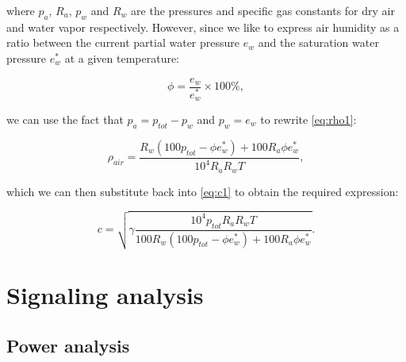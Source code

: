 \documentclass[11pt,titlepage]{report}
\begin{document}
\begin{appendices}
where $p_a$, $R_a$, $p_w$ and $R_w$ are the pressures and specific gas constants for dry air and water vapor respectively. However, since we like to express air humidity as a ratio between the current partial water pressure $e_w$ and the saturation water pressure $e^*_w$ at a given temperature:

\begin{equation}
	\phi = \frac{e_w}{e^*_w} \times 100\%,
\end{equation}

we can use the fact that $p_a = p_{tot} - p_w$ and $p_w = e_w$ to rewrite \ref{eq:rho1}:

\begin{equation} \label{eq:rho2}
	\rho_{air} = \frac{R_w(100 p_{tot} - \phi e^*_w) + 100 R_a \phi e^*_w}{10^4 R_a R_w T},
\end{equation}

which we can then substitute back into \ref{eq:c1} to obtain the required expression:

\begin{equation} \label{eq:c2}
	c = \sqrt{\gamma \frac{10^4 p_{tot} R_a R_w T}{100 R_w(100 p_{tot} - \phi e^*_w) + 100 R_a \phi e^*_w}}.
\end{equation}
\cite{sengpiel-sound-speed,uiuc-rel-humid,wikipedia-speed-of-sound}

\newcommand{\E}[1]{\operatorname{E}\left[#1\right]}
\newcommand{\Prob}[1]{\operatorname{P}\left[#1\right]}
\newcommand{\PSD}[1]{\operatorname{PSD}\left\{#1\right\}}
\let\F\Fold
\newcommand{\F}[1]{\mathcal{F}\left\{#1\right\}}
\newcommand{\Var}[1]{\operatorname{Var}\left[#1\right]}

\chapter{Signaling analysis}
\label{app:sig-an}
\section{Power analysis}

\end{appendices}
\end{document}
